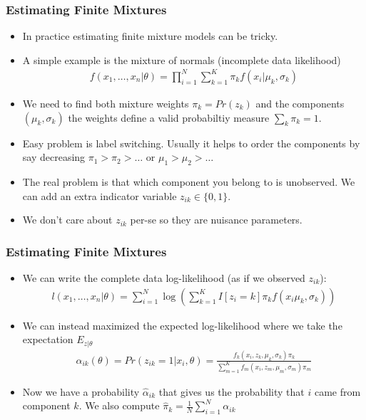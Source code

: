 \documentclass[aspectratio=169]{beamer}
\begin{document}
\begin{frame}
\frametitle{Estimating Finite Mixtures}
\begin{itemize}
\item In practice estimating finite mixture models can be tricky.
\item A simple example is the mixture of normals (incomplete data likelihood)
\begin{eqnarray*}
f(x_1,\ldots,x_n | \theta) = \prod_{i=1}^N \sum_{k=1}^K \pi_k f(x_i | \mu_k, \sigma_k)
\end{eqnarray*}
\item We need to find both mixture weights $\pi_k = Pr(z_k)$ and the components $(\mu_k,\sigma_k)$ the weights define a valid probabiltiy measure $\sum_k \pi_k = 1$.
\item Easy problem is \alert{label switching}. Usually it helps to order the components by say decreasing $\pi_1 > \pi_2 > \ldots$ or  $\mu_1 > \mu_2 > \ldots$ 
\item The real problem is that which component you belong to is unobserved. We can add an extra indicator variable $z_{ik} \in \{0,1\}$.
\item We don't care about $z_{ik}$ per-se so they are \alert{nuisance parameters}.
\end{itemize}
\end{frame}

\begin{frame}
\frametitle{Estimating Finite Mixtures}
\begin{itemize}
\item We can write the complete data log-likelihood (as if we observed $z_{ik}$):
\begin{eqnarray*}
l(x_1,\ldots,x_n | \theta) = \sum_{i=1}^N  \log \left( \sum_{k=1}^K I[z_i = k]  \pi_k f(x_i \mu_k, \sigma_k) \right)
\end{eqnarray*}
\item We can instead maximized the expected log-likelihood where we take the expectation $E_{z|\theta}$
\begin{eqnarray*}
\alpha_{ik}(\theta) = Pr(z_{ik} =1 | x_i,\theta) = \frac{f_k(x_i,z_k,\mu_k,\sigma_k) \pi_k }{\sum_{m=1}^K f_m(x_i,z_m,\mu_m,\sigma_m) \pi_m}
\end{eqnarray*}
\item Now we have a probability $\hat{\alpha}_{ik}$ that gives us the probability that $i$ came from component $k$. We also compute $\hat{\pi}_k = \frac{1}{N} \sum_{i=1}^N \alpha_{ik}$
\end{itemize}
\end{frame}
\end{document}
